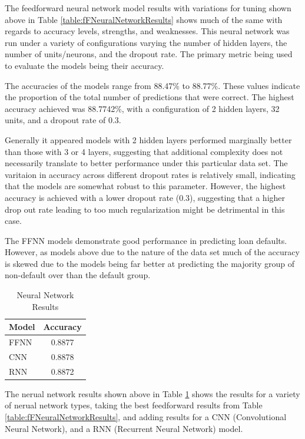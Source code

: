 \documentclass[12pt]{article}
\begin{document}
The feedforward neural network model results with variations for tuning shown above in Table \ref{table:fFNeuralNetworkResults} shows much of the same with regards to accuracy levels, strengths, and weaknesses. This neural network was run under a variety of configurations varying the number of hidden layers, the number of units/neurons, and the dropout rate. The primary metric being used to evaluate the models being their accuracy.

The accuracies of the models range from 88.47\% to 88.77\%. These values indicate the proportion of the total number of predictions that were correct. The highest accuracy achieved was 88.7742\%, with a configuration of 2 hidden layers, 32 units, and a dropout rate of 0.3. 

Generally it appeared models with 2 hidden layers performed marginally better than those with 3 or 4 layers, suggesting that additional complexity does not necessarily translate to better performance under this particular data set. The varitaion in accuracy across different dropout rates is relatively small, indicating that the models are somewhat robust to this parameter. However, the highest accuracy is achieved with a lower dropout rate (0.3), suggesting that a higher drop out rate leading to too much regularization might be detrimental in this case.

The FFNN models demonstrate good performance in predicting loan defaults. However, as models above due to the nature of the data set much of the accuracy is skewed due to the models being far better at predicting the majority group of non-default over than the default group.

\begin{table}[htbp]
    \centering
    \caption{Neural Network Results}
    \begin{tabular}{lc}
        \toprule
        Model & Accuracy \\
        \midrule
        FFNN & 0.8877 \\
        CNN & 0.8878 \\
        RNN & 0.8872 \\
        \bottomrule
    \end{tabular}
    \label{table:neuralNetworkResults}
\end{table}

The nerual network results shown above in Table \ref{table:neuralNetworkResults} shows the results for a variety of nerual network types, taking the best feedforward results from Table \ref{table:fFNeuralNetworkResults}, and adding results for a CNN (Convolutional Neural Network), and a RNN (Recurrent Neural Network) model.
\end{document}
